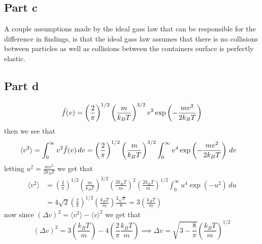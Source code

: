 \documentclass[12pt]{report}
\theoremstyle{custom}
\begin{document}
\subsection*{Part c}
A couple assumptions made by the ideal gass law that can be responsible for the difference in findings, is that the ideal gass law assumes that there is no collisions between particles as well as collisions between the containers surface is perfectly elastic. 

\subsection*{Part d}
\begin{equation*}
\Tilde{f}(v) = \left(\frac{2}{\pi}\right)^{1/2} \left(\frac{m}{k_BT}\right)^{3/2} v^2 \exp\left(-\frac{mv^2}{2k_BT}\right)
\end{equation*}
then we see that 
\begin{align*}
  \langle v^2 \rangle &= \int_0^\infty v^2 \Tilde{f}(v) \, dv =\left(\frac{2}{\pi}\right)^{1/2} \left(\frac{m}{k_BT}\right)^{3/2} \int_0^\infty v^4 \exp\left(-\frac{mv^2}{2k_BT}\right) \, dv 
\end{align*}
letting $u^2 = \frac{mv^2}{2k_BT}$ we get that 
\begin{align*}
  \langle v^2 \rangle &=\left(\frac{2}{\pi}\right)^{1/2} \left(\frac{m}{k_BT}\right)^{3/2} \left(\frac{2k_BT}{m}\right)^2 \left(\frac{2k_BT}{m}\right)^{1/2}\int_0^\infty u^4 \exp\left(-u^2\right) \, du \\
  &=4\sqrt{2}\left(\frac{2}{\pi}\right)^{1/2} \left(\frac{k_BT}{m}\right) \frac{3\sqrt{\pi}}{8} = 3\left(\frac{k_BT}{m}\right)
\end{align*}
now since $(\Delta v)^2 = \langle v^2 \rangle - \langle v \rangle^2$ we get that
\begin{equation*}
  (\Delta v)^2 =3\left(\frac{k_BT}{m}\right) - 4\left(\frac{2}{\pi} \frac{k_BT}{m}\right) \implies \Delta v = \sqrt{3-\frac{8}{\pi}}\left(\frac{k_BT}{m}\right)^{1/2}
\end{equation*}
\end{document}

